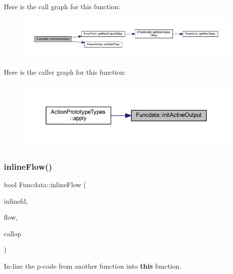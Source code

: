 Here is the call graph for this function\+:
\nopagebreak
\begin{figure}[H]
\begin{center}
\leavevmode
\includegraphics[width=350pt]{class_funcdata_ae454fbd3566fbd43103dcabdf2681fd8_cgraph}
\end{center}
\end{figure}
Here is the caller graph for this function\+:
\nopagebreak
\begin{figure}[H]
\begin{center}
\leavevmode
\includegraphics[width=350pt]{class_funcdata_ae454fbd3566fbd43103dcabdf2681fd8_icgraph}
\end{center}
\end{figure}
\mbox{\label{class_funcdata_a3bcc11dc2a2eefa48bc4b244094a521f}} 
\subsubsection{\texorpdfstring{inlineFlow()}{inlineFlow()}}
{\footnotesize\ttfamily bool Funcdata\+::inline\+Flow (\begin{DoxyParamCaption}\item[{\mbox{\hyperlink{class_funcdata}{Funcdata}} $\ast$}]{inlinefd,  }\item[{\mbox{\hyperlink{class_flow_info}{Flow\+Info}} \&}]{flow,  }\item[{\mbox{\hyperlink{class_pcode_op}{Pcode\+Op}} $\ast$}]{callop }\end{DoxyParamCaption})}



In-\/line the p-\/code from another function into {\bfseries{this}} function. 

